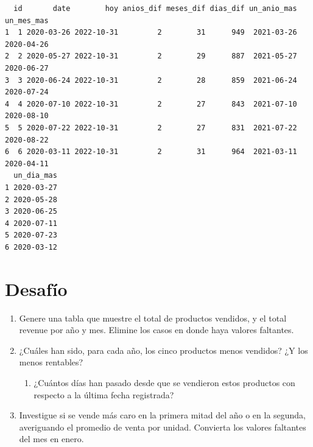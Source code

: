 \documentclass[
  letterpaper,
  DIV=11,
  numbers=noendperiod]{scrreprt}
\providecommand{\tightlist}{%
  \setlength{\itemsep}{0pt}\setlength{\parskip}{0pt}}\usepackage{longtable,booktabs,array}
\begin{document}
\begin{verbatim}
  id       date        hoy anios_dif meses_dif dias_dif un_anio_mas un_mes_mas
1  1 2020-03-26 2022-10-31         2        31      949  2021-03-26 2020-04-26
2  2 2020-05-27 2022-10-31         2        29      887  2021-05-27 2020-06-27
3  3 2020-06-24 2022-10-31         2        28      859  2021-06-24 2020-07-24
4  4 2020-07-10 2022-10-31         2        27      843  2021-07-10 2020-08-10
5  5 2020-07-22 2022-10-31         2        27      831  2021-07-22 2020-08-22
6  6 2020-03-11 2022-10-31         2        31      964  2021-03-11 2020-04-11
  un_dia_mas
1 2020-03-27
2 2020-05-28
3 2020-06-25
4 2020-07-11
5 2020-07-23
6 2020-03-12
\end{verbatim}

\hypertarget{desafuxedo-2}{%
\section{Desafío}\label{desafuxedo-2}}

\begin{enumerate}
\def\labelenumi{\arabic{enumi}.}
\item
  Genere una tabla que muestre el total de productos vendidos, y el
  total revenue por año y mes. Elimine los casos en donde haya valores
  faltantes.
\item
  ¿Cuáles han sido, para cada año, los cinco productos menos vendidos?
  ¿Y los menos rentables?

  \begin{enumerate}
  \def\labelenumii{\arabic{enumii}.}
  \tightlist
  \item
    ¿Cuántos días han pasado desde que se vendieron estos productos con
    respecto a la última fecha registrada?
  \end{enumerate}
\item
  Investigue si se vende más caro en la primera mitad del año o en la
  segunda, averiguando el promedio de venta por unidad. Convierta los
  valores faltantes del mes en enero.
\end{enumerate}
\end{document}
